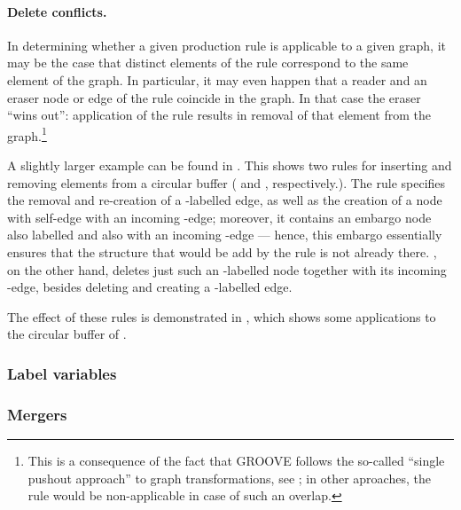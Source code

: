 \paragraph{Delete conflicts.}

In determining whether a given production rule is applicable to a given graph,
it may be the case that distinct elements of the rule correspond to the same
element of the graph. In particular, it may even happen that a reader and an
eraser node or edge of the rule coincide in the graph. In that case the eraser
``wins out'': application of the rule results in removal of that element from
the graph.\footnote{This is a consequence of the fact that GROOVE follows the
  so-called ``single pushout approach'' to graph transformations, see
  \cite{Loewe1993}; in other aproaches, the rule would be non-applicable in case
  of such an overlap.}

\begin{example}
A slightly larger example can be found in . This shows
two rules for inserting and removing elements from a circular buffer (\Put{}
and \Get, respectively.). The \Put{} rule specifies the removal and re-creation
of a \snip{\Last}-labelled edge, as well as the creation of a node with
self-edge \Object{} with an incoming \Val-edge; moreover, it contains an embargo
node also labelled \Object{} and also with an incoming \Val-edge --- hence,
this embargo essentially ensures that the structure that would be add by the
rule is not already there. \Get, on the other hand, deletes just such an
\Object-labelled node together with its incoming \Val-edge, besides deleting and
creating a \First-labelled edge.
%

The effect of these rules is demonstrated in , which
shows some applications to the circular buffer of .
%
\end{example}

\subsubsection{Label variables}

\subsubsection{Mergers}

